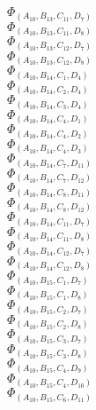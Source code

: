\documentclass[14pt]{article}
\begin{document}
    $\Phi_{({A}_{10}, {B}_{13}, {C}_{11}, {D}_{7})}$ \\ 
    $\Phi_{({A}_{10}, {B}_{13}, {C}_{11}, {D}_{8})}$ \\ 
    $\Phi_{({A}_{10}, {B}_{13}, {C}_{12}, {D}_{7})}$ \\ 
    $\Phi_{({A}_{10}, {B}_{13}, {C}_{12}, {D}_{8})}$ \\ 
    $\Phi_{({A}_{10}, {B}_{14}, {C}_{1}, {D}_{4})}$ \\ 
    $\Phi_{({A}_{10}, {B}_{14}, {C}_{2}, {D}_{4})}$ \\ 
    $\Phi_{({A}_{10}, {B}_{14}, {C}_{3}, {D}_{4})}$ \\ 
    $\Phi_{({A}_{10}, {B}_{14}, {C}_{4}, {D}_{1})}$ \\ 
    $\Phi_{({A}_{10}, {B}_{14}, {C}_{4}, {D}_{2})}$ \\ 
    $\Phi_{({A}_{10}, {B}_{14}, {C}_{4}, {D}_{3})}$ \\ 
    $\Phi_{({A}_{10}, {B}_{14}, {C}_{7}, {D}_{11})}$ \\ 
    $\Phi_{({A}_{10}, {B}_{14}, {C}_{7}, {D}_{12})}$ \\ 
    $\Phi_{({A}_{10}, {B}_{14}, {C}_{8}, {D}_{11})}$ \\ 
    $\Phi_{({A}_{10}, {B}_{14}, {C}_{8}, {D}_{12})}$ \\ 
    $\Phi_{({A}_{10}, {B}_{14}, {C}_{11}, {D}_{7})}$ \\ 
    $\Phi_{({A}_{10}, {B}_{14}, {C}_{11}, {D}_{8})}$ \\ 
    $\Phi_{({A}_{10}, {B}_{14}, {C}_{12}, {D}_{7})}$ \\ 
    $\Phi_{({A}_{10}, {B}_{14}, {C}_{12}, {D}_{8})}$ \\ 
    $\Phi_{({A}_{10}, {B}_{15}, {C}_{1}, {D}_{7})}$ \\ 
    $\Phi_{({A}_{10}, {B}_{15}, {C}_{1}, {D}_{8})}$ \\ 
    $\Phi_{({A}_{10}, {B}_{15}, {C}_{2}, {D}_{7})}$ \\ 
    $\Phi_{({A}_{10}, {B}_{15}, {C}_{2}, {D}_{8})}$ \\ 
    $\Phi_{({A}_{10}, {B}_{15}, {C}_{3}, {D}_{7})}$ \\ 
    $\Phi_{({A}_{10}, {B}_{15}, {C}_{3}, {D}_{8})}$ \\ 
    $\Phi_{({A}_{10}, {B}_{15}, {C}_{4}, {D}_{9})}$ \\ 
    $\Phi_{({A}_{10}, {B}_{15}, {C}_{4}, {D}_{10})}$ \\ 
    $\Phi_{({A}_{10}, {B}_{15}, {C}_{6}, {D}_{11})}$ \\ 
\end{document}
